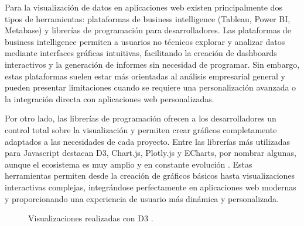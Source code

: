 Para la visualización de datos en aplicaciones web existen principalmente dos tipos de herramientas: plataformas de business intelligence (Tableau, Power BI, Metabase) y librerías de programación para desarrolladores. Las plataformas de business intelligence permiten a usuarios no técnicos explorar y analizar datos mediante interfaces gráficas intuitivas, facilitando la creación de dashboards interactivos y la generación de informes sin necesidad de programar. Sin embargo, estas plataformas suelen estar más orientadas al análisis empresarial general y pueden presentar limitaciones cuando se requiere una personalización avanzada o la integración directa con aplicaciones web personalizadas.

Por otro lado, las librerías de programación ofrecen a los desarrolladores un control total sobre la visualización y permiten crear gráficos completamente adaptados a las necesidades de cada proyecto. Entre las librerías más utilizadas para Javascript destacan D3, Chart.js, Plotly.js y ECharts, por nombrar algunas, aunque el ecosistema es muy amplio y en constante evolución \cite{Monterail2024_JSViz}. Estas herramientas permiten desde la creación de gráficos básicos hasta visualizaciones interactivas complejas, integrándose perfectamente en aplicaciones web modernas y proporcionando una experiencia de usuario más dinámica y personalizada.



\begin{figure}[H]
    \centering    {}
    \caption{Visualizaciones realizadas con D3 \cite{d3foto}.}
\end{figure}



